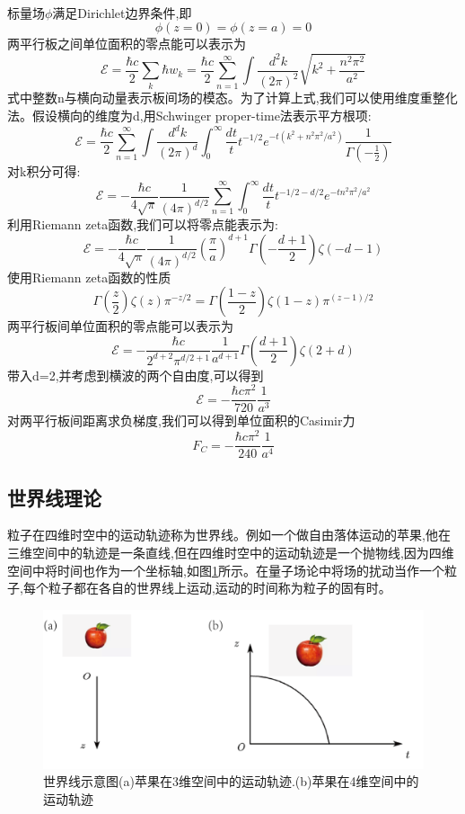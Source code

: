 \paragraph*{}
标量场$\phi$满足Dirichlet边界条件,即
$$
\phi(z=0)=\phi(z=a)=0
$$
两平行板之间单位面积的零点能可以表示为
$$
\mathcal{E} =\frac{\hbar c}{2}\sum_k{\hbar w_k}=\frac{\hbar c}{2}\sum_{n=1}^{\infty}{\int{\frac{d^2k}{\left( 2\pi \right) ^2}\sqrt{k^2+\frac{n^2\pi ^2}{a^2}}}}
$$
式中整数n与横向动量表示板间场的模态。为了计算上式,我们可以使用维度重整化法。假设横向的维度为d,用Schwinger proper-time法表示平方根项:
$$
\mathcal{E} =\frac{\hbar c}{2}\sum_{n=1}^{\infty}{\int{\frac{d^dk}{\left( 2\pi \right) ^d}\int_0^{\infty}{\frac{dt}{t}t^{-1/2}e^{-t\left( k^2+n^2\pi ^2/a^2 \right)}}}}\frac{1}{\varGamma \left( -\frac{1}{2} \right)}
$$
对k积分可得:
$$
\mathcal{E} =-\frac{\hbar c}{4\sqrt{\pi}}\frac{1}{\left( 4\pi \right) ^{d/2}}\sum_{n=1}^{\infty}{\int_0^{\infty}{\frac{dt}{t}t^{-1/2-d/2}e^{-tn^2\pi ^2/a^2}}}
$$
利用Riemann zeta函数,我们可以将零点能表示为:
$$
\mathcal{E} =-\frac{\hbar c}{4\sqrt{\pi}}\frac{1}{\left( 4\pi \right) ^{d/2}}\left( \frac{\pi}{a} \right) ^{d+1}\varGamma \left( -\frac{d+1}{2} \right) \zeta \left( -d-1 \right) 
$$
使用Riemann zeta函数的性质
$$
\varGamma \left( \frac{z}{2} \right) \zeta \left( z \right) \pi ^{-z/2}=\varGamma \left( \frac{1-z}{2} \right) \zeta \left( 1-z \right) \pi ^{\left( z-1 \right) /2}
$$
两平行板间单位面积的零点能可以表示为
$$
\mathcal{E} =-\frac{\hbar c}{2^{d+2}\pi ^{d/2+1}}\frac{1}{a^{d+1}}\varGamma \left( \frac{d+1}{2} \right) \zeta \left( 2+d \right) 
$$
带入d=2,并考虑到横波的两个自由度,可以得到
$$
\mathcal{E} =-\frac{\hbar c \pi ^2}{720}\frac{1}{a^3}
$$
对两平行板间距离求负梯度,我们可以得到单位面积的Casimir力
$$
F_C=-\frac{\hbar c\pi ^2}{240}\frac{1}{a^4}
$$



\subsection{世界线理论}
粒子在四维时空中的运动轨迹称为世界线。例如一个做自由落体运动的苹果,他在三维空间中的轨迹是一条直线,但在四维时空中的运动轨迹是一个抛物线,因为四维空间中将时间也作为一个坐标轴,如图\ref{fig:4}所示。在量子场论中将场的扰动当作一个粒子,每个粒子都在各自的世界线上运动,运动的时间称为粒子的固有时。
\begin{figure}[h]
	\centering
	\includegraphics[width=0.7\linewidth]{figures/世界线}
	\caption{世界线示意图(a)苹果在3维空间中的运动轨迹.(b)苹果在4维空间中的运动轨迹}
	\label{fig:4}
\end{figure}
